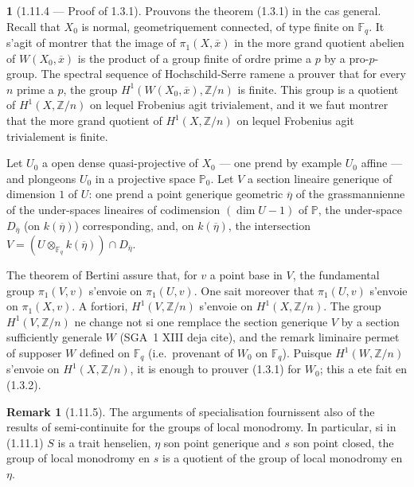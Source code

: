 \documentclass[12pt,a4paper]{article}
\theoremstyle{plain}
\theoremstyle{definition}
\newtheorem{remark}[theorem]{Remark}
\theoremstyle{definition}
\newtheorem{para}{}[section]
\theoremstyle{remark}
\begin{document}
\begin{para}[1.11.4 --- Proof of 1.3.1]
Prouvons the theorem (1.3.1) in the cas general. Recall that $X_0$ is normal, geometriquement connected, of type finite on $\mathbb{F}_q$. It s'agit of montrer that the image of $\pi_1(X, \overline{x})$ in the more grand quotient abelien of $W(X_0, \overline{x})$ is the product of a group finite of ordre prime a $p$ by a pro-$p$-group. The spectral sequence of Hochschild-Serre ramene a prouver that for every $n$ prime a $p$, the group $H^1(W(X_0, \overline{x}), \mathbb{Z}/n)$ is finite. This group is a quotient of $H^1(X, \mathbb{Z}/n)$ on lequel Frobenius agit trivialement, and it we faut montrer that the more grand quotient of $H^1(X, \mathbb{Z}/n)$ on lequel Frobenius agit trivialement is finite.

Let $U_0$ a open dense quasi-projective of $X_0$ --- one prend by example $U_0$ affine --- and plongeons $U_0$ in a projective space $\mathbb{P}_0$. Let $V$ a section lineaire generique of dimension $1$ of $U$: one prend a point generique geometric $\overline{\eta}$ of the grassmannienne of the under-spaces lineaires of codimension $(\dim U - 1)$ of $\mathbb{P}$, the under-space $D_{\overline{\eta}}$ (on $k(\overline{\eta})$) corresponding, and, on $k(\overline{\eta})$, the intersection $V = (U \otimes_{\mathbb{F}_q} k(\overline{\eta})) \cap D_{\overline{\eta}}$.

The theorem of Bertini assure that, for $v$ a point base in $V$, the fundamental group $\pi_1(V, v)$ s'envoie on $\pi_1(U, v)$. One sait moreover that $\pi_1(U, v)$ s'envoie on $\pi_1(X, v)$. A fortiori, $H^1(V, \mathbb{Z}/n)$ s'envoie on $H^1(X, \mathbb{Z}/n)$. The group $H^1(V, \mathbb{Z}/n)$ ne change not si one remplace the section generique $V$ by a section sufficiently generale $W$ (SGA~1 XIII deja cite), and the remark liminaire permet of supposer $W$ defined on $\mathbb{F}_q$ (i.e.~provenant of $W_0$ on $\mathbb{F}_q$). Puisque $H^1(W, \mathbb{Z}/n)$ s'envoie on $H^1(X, \mathbb{Z}/n)$, it is enough to prouver (1.3.1) for $W_0$; this a ete fait en (1.3.2).
\end{para}

\begin{remark}[1.11.5]
The arguments of specialisation fournissent also of the results of semi-continuite for the groups of local monodromy. In particular, si in (1.11.1) $S$ is a trait henselien, $\eta$ son point generique and $s$ son point closed, the group of local monodromy en $s$ is a quotient of the group of local monodromy en $\eta$.
\end{remark}
\end{document}
